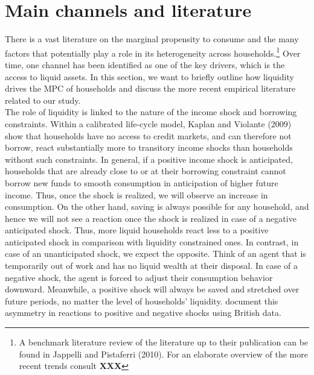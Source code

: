 \section{Main channels and literature} \label{sec:lit}
There is a vast literature on the marginal propensity to consume and the many factors that potentially play a role in its heterogeneity across households.\footnote{A benchmark literature review of the literature up to their publication can be found in Jappelli and Pistaferri (2010). For an elaborate overview of the more recent trends consult \textbf{XXX}} Over time, one channel has been identified as one of the key drivers, which is the access to liquid assets. In this section, we want to briefly outline how liquidity drives the MPC of households and discuss the more recent empirical literature related to our study. \\ 
The role of liquidity is linked to the nature of the income shock and borrowing constraints. Within a calibrated life-cycle model, Kaplan and Violante (2009) show that households have no access to credit markets, and can therefore not borrow, react substantially more to transitory income shocks than households without such constraints. In general, if a positive income shock is anticipated, households that are already close to or at their borrowing constraint cannot borrow new funds to smooth consumption in anticipation of higher future income. Thus, once the shock is realized, we will observe an increase in consumption. On the other hand, saving is always possible for any household, and hence we will not see a reaction once the shock is realized in case of a negative anticipated shock. Thus, more liquid households react less to a positive anticipated shock in comparison with liquidity constrained ones. In contrast, in case of an unanticipated shock, we expect the opposite. Think of an agent that is temporarily out of work and has no liquid wealth at their disposal. In case of a negative shock, the agent is forced to adjust their consumption behavior downward. Meanwhile, a positive shock will always be saved and stretched over future periods, no matter the level of households' liquidity. \cite{bunn_etal} document this asymmetry in reactions to positive and negative shocks using British data.\\
